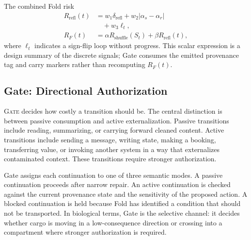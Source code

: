 The combined Fold risk
\begin{equation}
\begin{aligned}
    R_{\mathrm{refl}}(t)
    &=
    w_1\delta_{\mathrm{refl}}
    + w_2|\alpha_s-\alpha_r|\\
    &\quad + w_3\ell_t,\\
    R_F(t)
    &=
    \alpha R_{\mathrm{shuffle}}(S_t)
    + \beta R_{\mathrm{refl}}(t),
\end{aligned}
\end{equation}
where $\ell_t$ indicates a sign-flip loop without progress. This scalar expression is a design summary of the discrete signals; Gate consumes the emitted provenance tag and carry markers rather than recomputing $R_F(t)$.

\subsection{Gate: Directional Authorization}

\textsc{Gate} decides how costly a transition should be. The central distinction is between passive consumption and active externalization. Passive transitions include reading, summarizing, or carrying forward cleaned content. Active transitions include sending a message, writing state, making a booking, transferring value, or invoking another system in a way that externalizes contaminated context. These transitions require stronger authorization.

Gate assigns each continuation to one of three semantic modes. A passive continuation proceeds after narrow repair. An active continuation is checked against the current provenance state and the sensitivity of the proposed action. A blocked continuation is held because Fold has identified a condition that should not be transported. In biological terms, Gate is the selective channel: it decides whether cargo is moving in a low-consequence direction or crossing into a compartment where stronger authorization is required.

